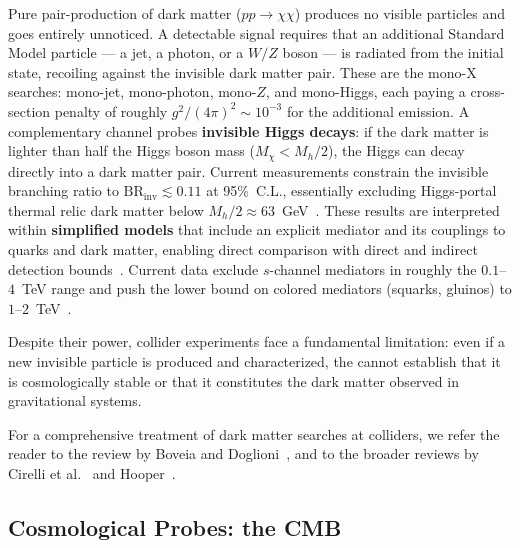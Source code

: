 Pure pair-production of dark matter ($pp \to \chi\chi$) produces no visible particles and goes entirely unnoticed.
A detectable signal requires that an additional Standard Model particle --- a jet, a photon, or a $W/Z$ boson --- is radiated from the initial state, recoiling against the invisible dark matter pair.
These are the mono-X searches: mono-jet, mono-photon, mono-$Z$, and mono-Higgs, each paying a cross-section penalty of roughly $g^2/(4\pi)^2 \sim 10^{-3}$ for the additional emission.
A complementary channel probes \textbf{invisible Higgs decays}: if the dark matter is lighter than half the Higgs boson mass ($M_\chi < M_h/2$), the Higgs can decay directly into a dark matter pair.
Current \LHC measurements constrain the invisible branching ratio to $\text{BR}_\text{inv} \lesssim 0.11$ at 95\%~C.L., essentially excluding Higgs-portal thermal relic dark matter below $M_h/2 \approx 63$~GeV~\cite{ATLAS:2023tkt}.
These results are interpreted within \textbf{simplified models} that include an explicit mediator and its couplings to quarks and dark matter, enabling direct comparison with direct and indirect detection bounds~\cite{Boveia:2018yeb}.
Current data exclude $s$-channel mediators in roughly the $0.1$--$4$~TeV range and push the lower bound on colored mediators (squarks, gluinos) to $1$--$2$~TeV~\cite{Hooper:2024}.

Despite their power, collider experiments face a fundamental limitation: even if a new invisible particle is produced and characterized, the \LHC cannot establish that it is cosmologically stable or that it constitutes the dark matter observed in gravitational systems.

For a comprehensive treatment of dark matter searches at colliders, we refer the reader to the review by Boveia and Doglioni~\cite{Boveia:2018yeb}, and to the broader reviews by Cirelli et al.~\cite{Cirelli:2024ssz} and Hooper~\cite{Hooper:2024}.

\subsection{\texorpdfstring{Cosmological Probes: the CMB}{Cosmological Probes: the CMB}}
\label{sec:1.3.3}


